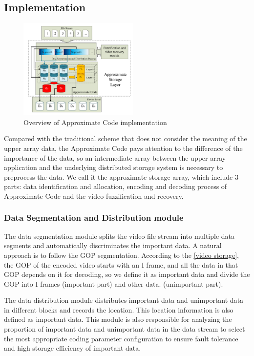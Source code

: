 \documentclass[sigconf]{acmart}
\begin{document}
\subsection{Implementation}\label{Implementation}
\begin{figure}[htb]
\centering
\includegraphics[height = 5cm]{photo/implementation-V2.pdf}
\caption{Overview of Approximate Code implementation}
\label{fig-implementation}
\end{figure}

Compared with the traditional scheme that does not consider the meaning of the upper array data, the Approximate Code pays attention to the difference of the importance of the data, so an intermediate array between the upper array application and the underlying distributed storage system is necessary to preprocess the data. We call it the approximate storage array, which include 3 parts: data identification and allocation, encoding and decoding process of Approximate Code and the video fuzzification and recovery.

\subsubsection{Data Segmentation and Distribution module}
The data segmentation module splits the video file stream into multiple data segments and automatically discriminates the important data. A natural approach is to follow the GOP segmentation. According to the \ref{video storage}, the GOP of the encoded video starts with an I frame, and all the data in that GOP depends on it for decoding, so we define it as important data and divide the GOP into I frames (important part) and other data. (unimportant part).

The data distribution module distributes important data and unimportant data in different blocks and records the location. This location information is also defined as important data. This module is also responsible for analyzing the proportion of important data and unimportant data in the data stream to select the most appropriate coding parameter configuration to ensure fault tolerance and high storage efficiency of important data.
\end{document}
